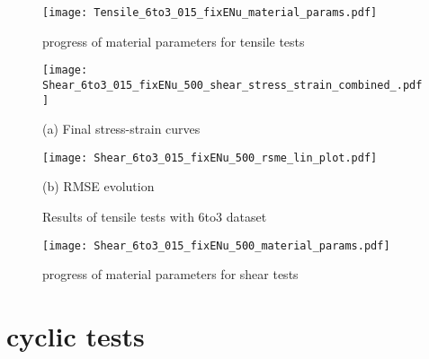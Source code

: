 \begin{figure}[H]
    \centering
    \texttt{[image: Tensile\_6to3\_015\_fixENu\_material\_params.pdf]}
    \caption{progress of material parameters for tensile tests}
    \label{fig:tensileMatParams}
\end{figure}

\begin{figure}[H]
    \centering
    \begin{minipage}[t]{0.495\textwidth}
        \centering
        \texttt{[image: Shear\_6to3\_015\_fixENu\_500\_shear\_stress\_strain\_combined\_.pdf]}
        \caption*{(a) Final stress-strain curves}
        \label{fig:shearStressStrain6to3}
    \end{minipage}
    \hfill
    \begin{minipage}[t]{0.495\textwidth}
        \centering
        \texttt{[image: Shear\_6to3\_015\_fixENu\_500\_rsme\_lin\_plot.pdf]}
        \caption*{(b) RMSE evolution}
        \label{subfigure:shearRMSE}
    \end{minipage}
    \caption{Results of tensile tests with 6to3 dataset}
    \label{fig:shearResults6to3}
\end{figure}


\begin{figure}[H]
    \centering
    \texttt{[image: Shear\_6to3\_015\_fixENu\_500\_material\_params.pdf]}
    \caption{progress of material parameters for shear tests}
    \label{fig:shearMatParams}
\end{figure}


\section{cyclic tests}







